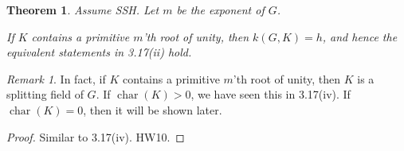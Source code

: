 \documentclass{article}
\theoremstyle{definition}
\theoremstyle{plain}
\newtheorem{theorem}{Theorem}[section]
\theoremstyle{remark}
\newtheorem*{remark*}{Remark}
\begin{document}
    \begin{theorem}
        Assume SSH. Let \(m\) be the exponent of \(G\).

        If \(K\) contains a primitive \(m\)'th root of unity, then \(k(G,K) = h\), and hence the equivalent statements in 3.17(ii) hold.
    \end{theorem}
    
    \begin{remark*}
        In fact, if \(K\) contains a primitive \(m\)'th root of unity, then \(K\) is a splitting field of \(G\). If \(\operatorname{char}(K) > 0\), we have seen this in 3.17(iv). If \(\operatorname{char}(K) = 0\), then it will be shown later.
    \end{remark*}

    \begin{proof}
        Similar to 3.17(iv). HW10.
    \end{proof}
\end{document}
